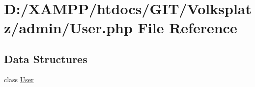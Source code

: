 \hypertarget{_user_8php}{}\section{D\+:/\+X\+A\+M\+P\+P/htdocs/\+G\+I\+T/\+Volksplatz/admin/\+User.php File Reference}
\label{_user_8php}
\subsection*{Data Structures}
\begin{DoxyCompactItemize}
\item 
class \mbox{\hyperlink{class_user}{User}}
\end{DoxyCompactItemize}
